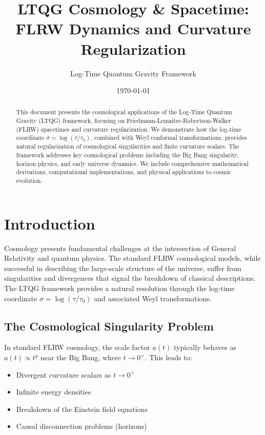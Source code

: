 \documentclass[11pt,a4paper]{article}
\title{\textbf{LTQG Cosmology \& Spacetime:\\
FLRW Dynamics and Curvature Regularization}}
\author{Log-Time Quantum Gravity Framework}
\date{\today}
\begin{document}
\maketitle

\begin{abstract}
This document presents the cosmological applications of the Log-Time Quantum Gravity (LTQG) framework, focusing on Friedmann-Lemaître-Robertson-Walker (FLRW) spacetimes and curvature regularization. We demonstrate how the log-time coordinate $\sigma = \log(\tau/\tau_0)$, combined with Weyl conformal transformations, provides natural regularization of cosmological singularities and finite curvature scalars. The framework addresses key cosmological problems including the Big Bang singularity, horizon physics, and early universe dynamics. We include comprehensive mathematical derivations, computational implementations, and physical applications to cosmic evolution.
\end{abstract}

\tableofcontents
\newpage

\section{Introduction}

Cosmology presents fundamental challenges at the intersection of General Relativity and quantum physics. The standard FLRW cosmological models, while successful in describing the large-scale structure of the universe, suffer from singularities and divergences that signal the breakdown of classical descriptions. The LTQG framework provides a natural resolution through the log-time coordinate $\sigma = \log(\tau/\tau_0)$ and associated Weyl transformations.

\subsection{The Cosmological Singularity Problem}

In standard FLRW cosmology, the scale factor $a(t)$ typically behaves as $a(t) \propto t^p$ near the Big Bang, where $t \to 0^+$. This leads to:

\begin{itemize}
\item Divergent curvature scalars as $t \to 0^+$
\item Infinite energy densities
\item Breakdown of the Einstein field equations
\item Causal disconnection problems (horizons)
\end{itemize}
\end{document}
